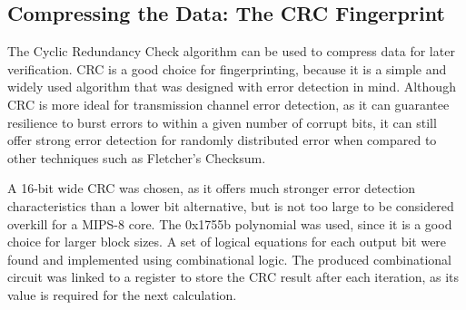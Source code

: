 \documentclass[10pt,journal,compsoc]{IEEEtran}
\begin{document}
\subsection{Compressing the Data: The CRC Fingerprint}

The Cyclic Redundancy Check algorithm can be used to compress data for later verification. CRC is a good choice for fingerprinting, because it is a simple and widely used algorithm that was designed with error detection in mind. Although CRC is more ideal for transmission channel error detection, as it can guarantee resilience to burst errors to within a given number of corrupt bits, it can still offer strong error detection for randomly distributed error when compared to other techniques such as Fletcher's Checksum.\

A 16-bit wide CRC was chosen, as it offers much stronger error detection characteristics than a lower bit alternative, but is not too large to be considered overkill for a MIPS-8 core. The 0x1755b polynomial was used, since it is a good choice for larger block sizes\cite{Koopman}. A set of logical equations for each output bit were found\cite{Parcrc} and implemented using combinational logic. The produced combinational circuit was linked to a register to store the CRC result after each iteration, as its value is required for the next calculation. 
\end{document}
